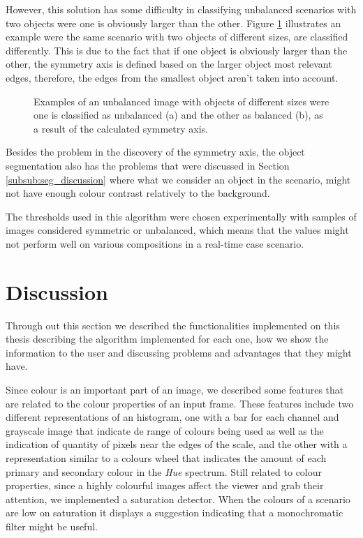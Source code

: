 However, this solution has some difficulty in classifying unbalanced scenarios with two objects were one is obviously larger than the other. Figure \ref{fig:unbalance_test} illustrates an example were the same scenario with two objects of different sizes, are classified differently. This is due to the fact that if one object is obviously larger than the other, the symmetry axis is defined based on the larger object most relevant edges, therefore, the edges from the smallest object aren't taken into account.

\begin{figure}[htbp]
	\centering
    \caption{Examples of an unbalanced image with objects of different sizes were one is classified as unbalanced (a) and the other as balanced (b), as a result of the calculated symmetry axis.}
    \label{fig:unbalance_test}
\end{figure}


Besides the problem in the discovery of the symmetry axis, the object segmentation also has the problems that were discussed in Section \ref{subsub:seg_discussion} where what we consider an object in the scenario, might not have enough colour contrast relatively to the background.

The thresholds used in this algorithm were chosen experimentally with samples of images considered symmetric or unbalanced, which means that the values might not perform well on various compositions in a real-time case scenario.

\section{Discussion}
\label{sec:system_discussion}

Through out this section we described the functionalities implemented on this thesis describing the algorithm implemented for each one, how we show the information to the user and discussing problems and advantages that they might have.

Since colour is an important part of an image, we described some features that are related to the colour properties of an input frame. These features include two different representations of an histogram, one with a bar for each channel and grayscale image that indicate de range of colours being used as well as the indication of quantity of pixels near the edges of the scale, and the other with a representation similar to a colours wheel that indicates the amount of each primary and secondary colour in the \emph{Hue} spectrum. Still related to colour properties, since a highly colourful images affect the viewer and grab their attention, we implemented a saturation detector. When the colours of a scenario are low on saturation it displays a suggestion indicating that a monochromatic filter might be useful.

